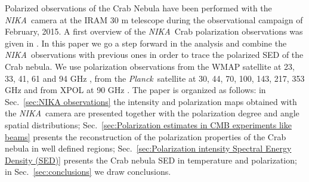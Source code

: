 \documentclass[twocolumn,traditabstract]{aa}
\def\NIKA{\textit{NIKA}}
\def\Planck{\textit{Planck}}
\begin{document}
Polarized observations of the Crab Nebula have been performed with the \NIKA\ camera \citep{monfardini2010,catalano2014,monfardini2014} at the IRAM 30 m telescope during the observational campaign of February, 2015. A first overview of the \NIKA\ Crab polarization observations was given in \cite{2016JLTP..184..724R}. In this paper we go a step forward in the analysis and combine the \NIKA\ observations with previous ones
in order to trace the polarized SED of the Crab nebula. We use polarization observations from the WMAP satellite at 23, 33, 41, 61 and 94 GHz \citep{2011ApJS..192...19W}, from the \Planck\ satellite at 30, 44, 70, 100, 143, 217, 353 GHz and from XPOL at 90 GHz \citep{aumont2010}. 
 The paper is organized as follows: in Sec.~\ref{sec:NIKA observations} the intensity and polarization maps obtained with the \NIKA\ camera are presented together with the polarization degree and angle spatial distributions; Sec.~\ref{sec:Polarization estimates in CMB experiments like beams} presents the reconstruction of the polarization properties of the Crab nebula in well defined regions; Sec.~\ref{sec:Polarization intensity Spectral Energy Density (SED)} presents the Crab nebula SED in temperature and polarization; in Sec.~\ref{sec:conclusions} we draw conclusions.
\end{document}
